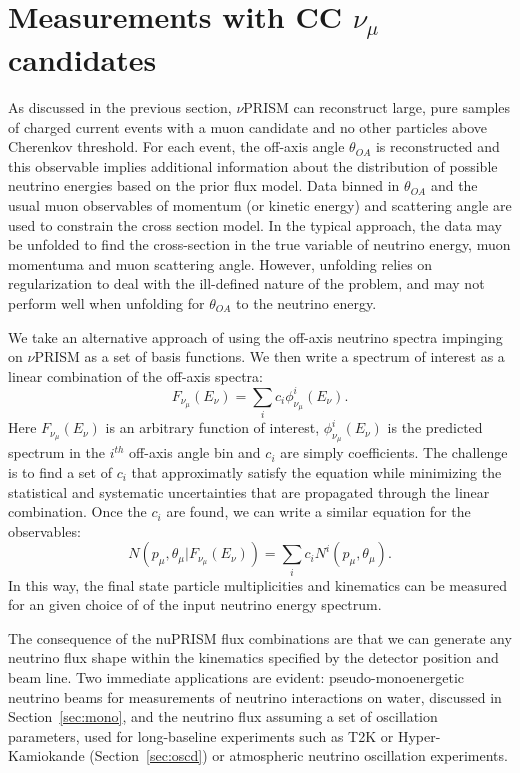 \section{Measurements with CC $\nu_{\mu}$ candidates \label{sec:nuprism_numu}}


As discussed in the previous section, $\nu$PRISM can reconstruct large, pure samples of charged current
events with a muon candidate and no other particles above Cherenkov threshold.  For each event, the
off-axis angle $\theta_{OA}$ is reconstructed and this observable implies additional information about the
distribution of possible neutrino energies based on the prior flux model.  Data binned in $\theta_{OA}$ and the
usual muon observables of momentum (or kinetic energy) and scattering angle are used to constrain the
cross section model.  In the typical approach, the data may be unfolded to find the cross-section in the
true variable of neutrino energy, muon momentuma and muon scattering angle.  However, unfolding relies 
on regularization to deal with the ill-defined nature of the problem, and may not perform well when 
unfolding for $\theta_{OA}$ to the neutrino energy.

We take an alternative approach of using the off-axis neutrino spectra impinging on $\nu$PRISM as a set of basis
functions.  We then write a spectrum of interest as a linear combination of the off-axis spectra:
\begin{equation}
F_{\nu_{\mu}}(E_{\nu}) = \sum_{i} c_{i}\phi^{i}_{\nu_{\mu}}(E_{\nu}).
\end{equation}
Here $F_{\nu_{\mu}}(E_{\nu})$ is an arbitrary function of interest, $\phi^{i}_{\nu_{\mu}}(E_{\nu})$ is the predicted spectrum
in the $i^{th}$ off-axis angle bin and $c_{i}$ are simply coefficients.  The challenge is to find a set of $c_{i}$
that approximatly satisfy the equation while minimizing the statistical and systematic uncertainties that are propagated through the
linear combination.  Once the $c_{i}$ are found, we can write a similar equation for the observables:
\begin{equation}
N(p_{\mu},\theta_{\mu}|F_{\nu_{\mu}}(E_{\nu})) = \sum_{i} c_{i}N^{i}(p_{\mu},\theta_{\mu}).
\end{equation}
In this way, the final state particle multiplicities and kinematics can be measured for an given choice of 
of the input neutrino energy spectrum.  

The consequence of the nuPRISM flux combinations are that we can generate any neutrino flux shape within the kinematics specified by the detector position and beam line. Two immediate applications are evident: pseudo-monoenergetic neutrino beams for measurements of neutrino interactions on water, discussed in Section~\ref{sec:mono}, and the neutrino flux assuming a set of oscillation parameters, used  for long-baseline experiments such as T2K or Hyper-Kamiokande (Section~\ref{sec:oscd}) or atmospheric neutrino oscillation experiments.

